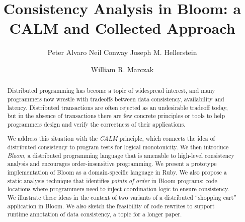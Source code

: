 \documentclass{sig-alternate}
\begin{document}
\title{Consistency Analysis in Bloom: a CALM and Collected Approach}

\author{
\alignauthor
Peter Alvaro
\alignauthor
Neil Conway
\alignauthor
Joseph M. Hellerstein
\and
\alignauthor
William R. Marczak
}

\maketitle

\begin{abstract} 

Distributed programming has become a topic of widespread interest, and many programmers now wrestle with tradeoffs between data consistency, availability and latency.  Distributed transactions are often rejected as an undesirable tradeoff today, but in the absence of transactions there are few concrete principles or tools to help programmers design and verify the correctness of their applications.

We address this situation with the \emph{CALM} principle, which connects the idea of distributed consistency to program tests for logical monotonicity.  We then introduce \emph{Bloom}, a distributed programming language that is amenable to high-level consistency analysis and encourages order-insensitive programming.  We present a prototype implementation of Bloom as a domain-specific language in Ruby. We also propose a static analysis technique that identifies {\em points of order} in Bloom programs: code locations where programmers need to inject coordination logic to ensure consistency.  
We illustrate these ideas in the context of two variants
of a distributed ``shopping cart'' application in Bloom.  We also sketch the feasibility of code rewrites to support runtime annotation of data consistency, a topic for a longer paper.


\end{abstract}
\end{document}
